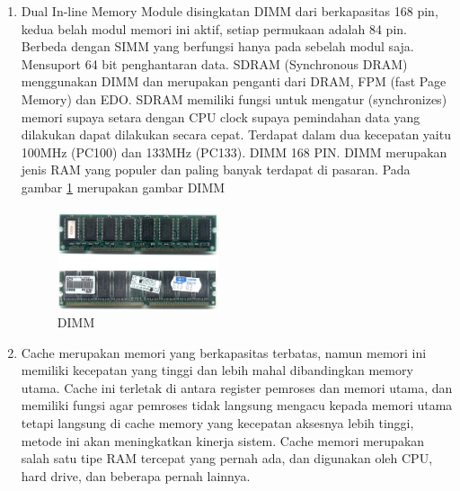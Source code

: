 \begin{enumerate}
\item Dual In-line Memory Module disingkatan DIMM dari  berkapasitas 168 pin, kedua belah modul memori ini aktif, setiap permukaan adalah 84 pin. Berbeda dengan SIMM yang berfungsi hanya pada sebelah modul saja. Mensuport 64 bit penghantaran data. SDRAM
(Synchronous DRAM) menggunakan DIMM dan merupakan penganti dari DRAM, FPM (fast Page Memory) dan EDO. SDRAM memiliki fungsi untuk mengatur (synchronizes) memori supaya setara dengan CPU clock supaya pemindahan data yang dilakukan dapat dilakukan secara cepat. Terdapat dalam dua kecepatan yaitu 100MHz (PC100) dan 133MHz (PC133). DIMM 168 PIN. DIMM merupakan jenis RAM yang populer dan paling banyak terdapat di pasaran. Pada gambar \ref{labelgambar3} merupakan gambar DIMM
\begin{figure}[htbp]
\centering
\includegraphics[width=0.45\textwidth]{figures/image/dimm.jpg}
\caption{DIMM}
\label{labelgambar3}
\end{figure}

\item Cache merupakan memori yang berkapasitas terbatas, namun memori ini memiliki kecepatan  yang tinggi dan lebih mahal dibandingkan memory utama. Cache ini terletak di antara register pemroses dan memori utama, dan memiliki fungsi agar pemroses tidak langsung mengacu kepada memori utama tetapi langsung di cache memory yang kecepatan aksesnya lebih tinggi, metode ini akan meningkatkan kinerja sistem. Cache memori merupakan salah satu tipe RAM tercepat yang pernah ada, dan digunakan oleh CPU, hard drive, dan beberapa pernah lainnya.


\end{enumerate}

